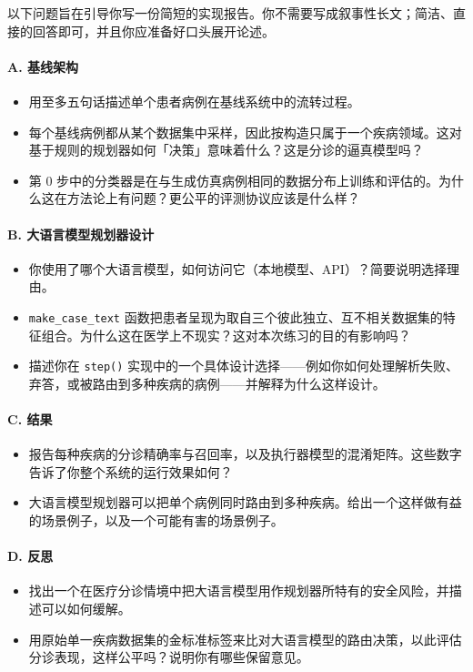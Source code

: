 以下问题旨在引导你写一份简短的实现报告。你不需要写成叙事性长文；简洁、直接的回答即可，并且你应准备好口头展开论述。

\paragraph{A. 基线架构}
\begin{itemize}
    \item 用至多五句话描述单个患者病例在基线系统中的流转过程。
    \item 每个基线病例都从某个数据集中采样，因此按构造只属于一个疾病领域。这对基于规则的规划器如何「决策」意味着什么？这是分诊的逼真模型吗？
    \item 第 0 步中的分类器是在与生成仿真病例相同的数据分布上训练和评估的。为什么这在方法论上有问题？更公平的评测协议应该是什么样？
\end{itemize}

\paragraph{B. 大语言模型规划器设计}
\begin{itemize}
    \item 你使用了哪个大语言模型，如何访问它（本地模型、API）？简要说明选择理由。
    \item \texttt{make\_case\_text} 函数把患者呈现为取自三个彼此独立、互不相关数据集的特征组合。为什么这在医学上不现实？这对本次练习的目的有影响吗？
    \item 描述你在 \texttt{step()} 实现中的一个具体设计选择——例如你如何处理解析失败、弃答，或被路由到多种疾病的病例——并解释为什么这样设计。
\end{itemize}

\paragraph{C. 结果}
\begin{itemize}
    \item 报告每种疾病的分诊精确率与召回率，以及执行器模型的混淆矩阵。这些数字告诉了你整个系统的运行效果如何？
    \item 大语言模型规划器可以把单个病例同时路由到多种疾病。给出一个这样做有益的场景例子，以及一个可能有害的场景例子。
\end{itemize}

\paragraph{D. 反思}
\begin{itemize}
    \item 找出一个在医疗分诊情境中把大语言模型用作规划器所特有的安全风险，并描述可以如何缓解。
    \item 用原始单一疾病数据集的金标准标签来比对大语言模型的路由决策，以此评估分诊表现，这样公平吗？说明你有哪些保留意见。
\end{itemize}


